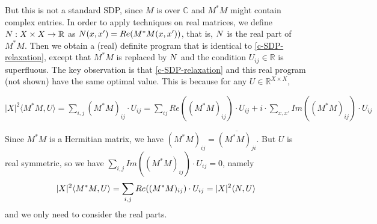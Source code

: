 But this is not a standard SDP,
since $M$ is over $\mathbb{C}$ and $M^{*}M$ might contain complex entries.
In order to apply techniques on real matrices,
we define $N:X\times X\rightarrow \mathbb{R}$ as $N(x,x')=Re(M^{*}M(x,x'))$,
that is,
$N$ is the real part of $M^{*}M$.
Then we obtain a (real) definite program that is identical to \eqref{c-SDP-relaxation}, except that $M^* M$ is replaced by $N$ and the condition $U_{ij}\in \mathbb{R}$ is superfluous.
%
The key observation is that \eqref{c-SDP-relaxation} and this real program (not shown) have the same optimal value.
This is because for any $U\in \mathbb{R}^{X\times X}$,\\
\centerline{$\displaystyle |X|^2\langle M^{*} M,U\rangle=\sum_{i,j}(M^{*}M)_{ij}\cdot U_{ij}=\sum_{ij}Re((M^{*}M)_{ij})\cdot U_{ij}+i\cdot\sum_{x,x'}Im((M^{*}M)_{ij})\cdot U_{ij}$}
Since $M^{*}M$ is a Hermitian matrix,
we have $(M^{*}M)_{ij}=\overline{(M^{*}M)_{ji}}$.
But $U$ is real symmetric,
so we have $\sum_{i,j}Im((M^{*}M)_{ij})\cdot U_{ij}=0$,
namely
\[
|X|^2\langle M^{*} M,U\rangle=\sum_{i,j}Re((M^{*}M)_{ij})\cdot U_{ij}=|X|^2\langle N,U\rangle
\]
and we only need to consider the real parts.

